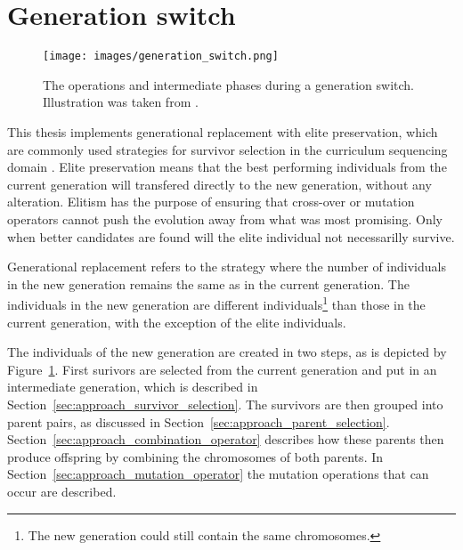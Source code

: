 \section{Generation switch}
\label{sec:approach_generation_switch}
\begin{figure}[ht!]
	\centering
	\texttt{[image: images/generation\_switch.png]}
	\caption[Generation switch]{The operations and intermediate phases during a generation switch. Illustration was taken from \citep{Whitley1994}.}
	\label{fig:generation_switch}
\end{figure}
This thesis implements generational replacement with elite preservation, which
are commonly used strategies for survivor selection in the curriculum
sequencing domain \citep{AlMuhaideb2011}.
Elite preservation means that the best performing individuals from the current
generation will transfered directly to the new generation, without any
alteration. Elitism has the purpose of ensuring that cross-over or mutation
operators cannot push the evolution away from what was most promising.
Only when better candidates are found will the elite individual not necessarilly survive.

Generational replacement refers to the strategy where the number of individuals
in the new generation remains the same as in the current generation. The
individuals in the new generation are different individuals\footnote{The new
generation  could still contain the same chromosomes.} than those in the
current generation, with the exception of the elite individuals.

The individuals of the new generation are created in two steps, as is depicted
by Figure~\ref{fig:generation_switch}. First surivors are selected from the
current generation and put in an intermediate generation, which is described in
Section~\ref{sec:approach_survivor_selection}. The survivors are then grouped
into parent pairs, as discussed in
Section~\ref{sec:approach_parent_selection}.
Section~\ref{sec:approach_combination_operator} describes how these parents
then produce offspring by combining the chromosomes of both parents. In
Section~\ref{sec:approach_mutation_operator} the mutation operations that
can occur are described.

